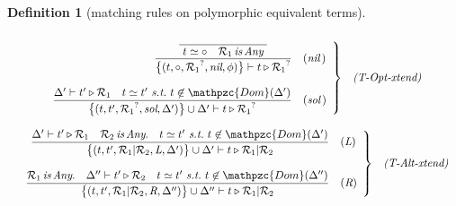 \documentclass[12pt]{article}
\newtheorem{Definition}{Definition}[section]
\begin{document}
\begin{Definition}[matching rules on polymorphic equivalent terms]
\begin{displaymath}
\begin{array}{c}
    \end{array}
  \end{displaymath}
  
  \begin{displaymath}
    \begin{array}{c}
      
      \begin{array}{rl}
        \left. \begin{array}{rl}
          
          \dfrac{
            \dfrac{}{
              \raisebox{0.5ex}[2.3ex][0ex]{
                $t \simeq \circ
                  \quad \mathcal{R}_1 \,\text{\it is}\, \text{\it Any}$
              }
            }
          }{
            \bigl\{(t, \circ, {\mathcal{R}_1}^?, \text{\it nil}, \phi)
             \bigr\} \vdash t \triangleright {\mathcal{R}_1}^?
          }  &  (\text{\it nil}\,)  \\
          \\
          
          \dfrac{
            \Delta' \vdash t' \triangleright \mathcal{R}_1 \quad
             t \simeq t'\ \text{\it s.t.}\
              t \not\in \mathpzc{Dom}(\Delta')
          }{
            \bigl\{(t, t', {\mathcal{R}_1}^?, \text{\it sol},
             \Delta') \bigr\} \cup \Delta' \vdash
              t \triangleright {\mathcal{R}_1}^?
          }  &  (\text{\it sol}\,)
        \end{array} \right\}  &  \text{\it (T-Opt-xtend)}
      \end{array}  \\
      \\
      
      \begin{array}{rl}
        \left. \begin{array}{rl}
          \dfrac{
            \Delta' \vdash t' \triangleright \mathcal{R}_1 \quad
             \mathcal{R}_2 \,\text{\it is}\, \text{\it Any}. \quad
              t \simeq t'\ \text{\it s.t.}\
               t \not\in \mathpzc{Dom}(\Delta')
          }{
            \bigl\{(t, t', \mathcal{R}_1|\mathcal{R}_2,
             \text{\it L}, \Delta') \bigr\} \cup \Delta' \vdash
              t \triangleright \mathcal{R}_1|\mathcal{R}_2
          }  &  (\text{\it L})  \\
          \\
          
          \dfrac{
            \mathcal{R}_1 \,\text{\it is}\, \text{\it Any}. \quad
             \Delta'' \vdash t' \triangleright \mathcal{R}_2 \quad
              t \simeq  t'\ \text{\it s.t.}\
               t \not\in \mathpzc{Dom}(\Delta'')
          }{
            \bigl\{(t, t', \mathcal{R}_1|\mathcal{R}_2,
             \text{\it R}, \Delta'') \bigr\} \cup \Delta'' \vdash
              t \triangleright \mathcal{R}_1|\mathcal{R}_2
          }  &  (\text{\it R})
        \end{array} \right\}  &  \text{\it (T-Alt-xtend)}
      \end{array}
      

\end{array}
\end{displaymath}
\end{Definition}
\end{document}
